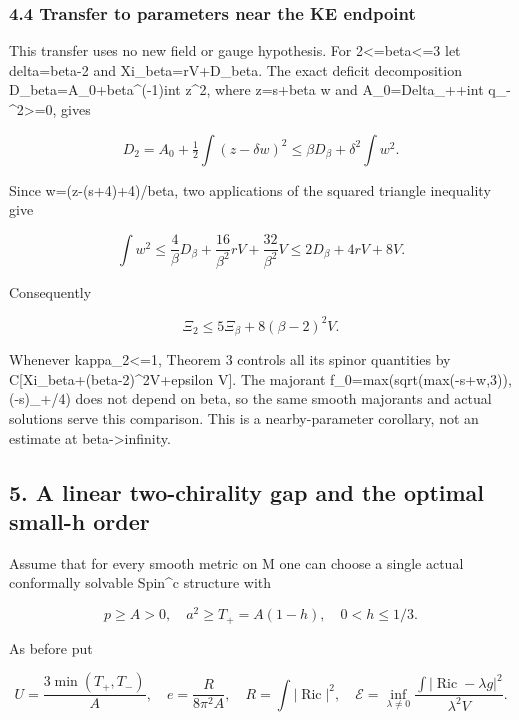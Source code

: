 \documentclass[
  10pt,
]{article}
\begin{document}
\hypertarget{transfer-to-parameters-near-the-ke-endpoint}{%
\subsubsection{4.4 Transfer to parameters near the KE
endpoint}\label{transfer-to-parameters-near-the-ke-endpoint}}

This transfer uses no new field or gauge hypothesis. For
2\textless=beta\textless=3 let delta=beta-2 and Xi\_beta=rV+D\_beta. The
exact deficit decomposition D\_beta=A\_0+beta\^{}(-1)int z\^{}2, where
z=s+beta w and A\_0=Delta\_++int q\_-\^{}2\textgreater=0, gives

\[
 D_2=A_0+\tfrac12\int(z-\delta w)^2
       \le\beta D_\beta+\delta^2\int w^2.
\]

Since w=(z-(s+4)+4)/beta, two applications of the squared triangle
inequality give

\[
 \int w^2\le\frac4\beta D_\beta+
                \frac{16}{\beta^2}rV+\frac{32}{\beta^2}V
             \le2D_\beta+4rV+8V.
\]

Consequently

\[
                    \Xi_2\le5\Xi_\beta+8(\beta-2)^2V. \tag{4.18}
\]

Whenever kappa\_2\textless=1, Theorem 3 controls all its spinor
quantities by C{[}Xi\_beta+(beta-2)\^{}2V+epsilon V{]}. The majorant
f\_0=max(sqrt(max(-s+w,3)),(-s)\_+/4) does not depend on beta, so the
same smooth majorants and actual solutions serve this comparison. This
is a nearby-parameter corollary, not an estimate at
beta-\textgreater infinity.

\hypertarget{a-linear-two-chirality-gap-and-the-optimal-small-h-order}{%
\subsection{5. A linear two-chirality gap and the optimal small-h
order}\label{a-linear-two-chirality-gap-and-the-optimal-small-h-order}}

Assume that for every smooth metric on M one can choose a single actual
conformally solvable Spin\^{}c structure with

\[
 p\ge A>0,\quad a^2\ge T_+=A(1-h),\quad 0<h\le1/3.
\]

As before put

\[
 U=\frac{3\min(T_+,T_-)}A,\quad
 e=\frac{R}{8\pi^2A},\quad R=\int|\operatorname{Ric}|^2,
 \quad\mathcal E=\inf_{\lambda\ne0}
       \frac{\int|\operatorname{Ric}-\lambda g|^2}{\lambda^2V}.
\]
\end{document}
